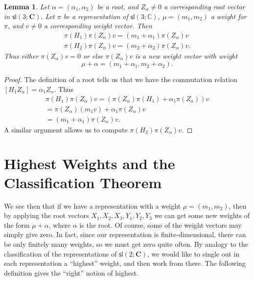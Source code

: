 \documentclass{amsbook}
\theoremstyle{plain}
\newtheorem{lemma}[theorem]{Lemma}
\numberwithin{equation}{chapter}
\numberwithin{theorem}{chapter}
\begin{document}
\begin{lemma}
\label{weight.root}Let $\alpha=(\alpha_{1},\alpha_{2})$ be a root, and
$Z_{\alpha}\neq0$ a corresponding root vector in $\mathsf{sl}\left(
3;\mathbf{C}\right)  $. Let $\pi$ be a representation of $\mathsf{sl}\left(
3;\mathbb{C}\right)  $, $\mu=(m_{1},m_{2})$ a weight for $\pi$, and $v\neq0$ a
corresponding weight vector. Then
\begin{align*}
\pi(H_{1})\pi(Z_{\alpha})v=(m_{1}+\alpha_{1})\pi(Z_{\alpha})v\\
\pi(H_{2})\pi(Z_{\alpha})v=(m_{2}+\alpha_{2})\pi(Z_{\alpha})v\text{.}%
\end{align*}
Thus either $\pi(Z_{\alpha})v=0$ or else $\pi(Z_{\alpha})v$ is a new weight
vector with weight
\[
\mu+\alpha=(m_{1}+\alpha_{1},m_{2}+\alpha_{2})\text{.}%
\]
\end{lemma}

\begin{proof}
The definition of a root tells us that we have the commutation relation
$\left[  H_{1}Z_{\alpha}\right]  =\alpha_{1}Z_{\alpha}$. Thus
\begin{align*}
\pi(H_{1})\pi(Z_{\alpha})v=\left(  \pi(Z_{\alpha})\pi(H_{1})+\alpha_{1}%
\pi(Z_{a})\right)  v\\
=\pi(Z_{\alpha})(m_{1}v)+\alpha_{1}\pi(Z_{\alpha})v\\
=(m_{1}+\alpha_{1})\pi(Z_{\alpha})v\text{.}%
\end{align*}
A similar argument allows us to compute $\pi(H_{2})\pi(Z_{\alpha})v$.
\end{proof}

\section{Highest Weights and the Classification Theorem}

We see then that if we have a representation with a weight $\mu=(m_{1},m_{2}%
)$, then by applying the root vectors $X_{1},X_{2},X_{3},Y_{1},Y_{2},Y_{3}$ we
can get some new weights of the form $\mu+\alpha$, where $\alpha$ is the root.
Of course, some of the weight vectors may simply give zero. In fact, since our
representation is finite-dimensional, there can be only finitely many weights,
so we must get zero quite often. By analogy to the classification of the
representations of $\mathsf{sl}(2;\mathbf{C})$, we would like to single out in
each representation a ``highest'' weight, and then work from there. The
following definition gives the ``right'' notion of highest.
\end{document}
